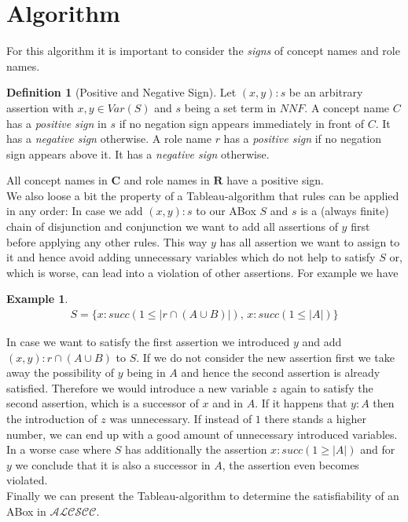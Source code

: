\documentclass[a4paper,11pt]{scrartcl}
\theoremstyle{break}
\theoremstyle{definition}
\newtheorem{mydef}{Definition}
\newtheorem{ex}{Example}
\begin{document}
\section{Algorithm}
For this algorithm it is important to consider the \textit{signs} of concept names and role names.
\begin{mydef}[Positive and Negative Sign]
Let $(x,y):s$ be an arbitrary assertion with $x,y\in Var(S)$ and $s$ being a set term in $NNF$. A concept name $C$ has a \textit{positive sign} in $s$ if no negation sign appears immediately in front of $C$. It has a \textit{negative sign} otherwise. A role name $r$ has a \textit{positive sign} if no negation sign appears above it. It has a \textit{negative sign} otherwise.
\end{mydef}
All concept names in $\mathbf{C}$ and role names in $\mathbf{R}$ have a positive sign.\\
We also loose a bit the property of a Tableau-algorithm that rules can be applied in any order: In case we add $(x,y):s$ to our ABox $S$ and $s$ is a (always finite) chain of disjunction and conjunction we want to add all assertions of $y$ first before applying any other rules. This way $y$ has all assertion we want to assign to it and hence avoid adding unnecessary variables which do not help to satisfy $S$ or, which is worse, can lead into a violation of other assertions. For example we have
\begin{ex}\label{order}
\begin{align*}
S=\{x:succ(1\leq|r\cap (A\cup B)|),\,x:succ(1\leq |A|)\}
\end{align*}
\end{ex}
In case we want to satisfy the first assertion we introduced $y$ and add $(x,y):r\cap (A\cup B)$ to $S$. If we do not consider the new assertion first we take away the possibility of $y$ being in $A$ and hence the second assertion is already satisfied. Therefore we would introduce a new variable $z$ again to satisfy the second assertion, which is a successor of $x$ and in $A$. If it happens that $y:A$ then the introduction of $z$ was unnecessary. If instead of $1$ there stands a higher number, we can end up with a good amount of unnecessary introduced variables. In a worse case where $S$ has additionally the assertion $x:succ(1\geq |A|)$ and for $y$ we conclude that it is also a successor in $A$, the assertion even becomes violated.\\
Finally we can present the Tableau-algorithm to determine the satisfiability of an ABox in $\mathcal{ALCSCC}$.
\end{document}
